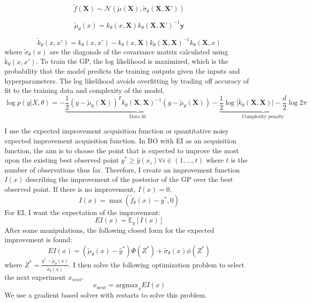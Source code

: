 \begin{equation}
     \tilde f(\mathbf X) \sim \mathcal N(\tilde \mu(\mathbf X), \tilde \sigma_{\theta}(\mathbf X, \mathbf X'))
\end{equation}

\begin{equation}
    \tilde \mu_{\theta}(x) = k_{\theta}(x, \mathbf X)k_{\theta}(\mathbf X, \mathbf X')^{-1} \mathbf y
\end{equation}

\begin{equation}
    \tilde k_{\theta}(x,x') = k_{\theta}( x, x')-k_{\theta}(x, \mathbf X) k_{\theta}(\mathbf X, \mathbf X)^{-1}k_{\theta}(\mathbf X, x)
\end{equation}
where $\tilde \sigma_{\theta}(x)$ are the diagonals of the covariance matrix calculated using $\tilde k_{\theta}(x, x')$.
To train the GP, the log likelihood is maximized, which is the probability that the model predicts the training outputs given the inputs and hyperparameters. The log likelihood avoids overfitting by trading off accuracy of fit to the training data and complexity of the model.
\begin{equation}
    \log p(y \vert X, \theta) = -\underbrace{\frac{1}{2}(y-\tilde \mu_{\theta}(\mathbf X))^T k_{\theta}(\mathbf X, \mathbf X)^{-1}(y- \tilde\mu_{\theta}(\mathbf X)) }_{\text{Data  fit}}- \underbrace{\frac{1}{2} \log{\vert \tilde k_{\theta}(\mathbf X, \mathbf X) \vert} - \frac{d}{2}\log{2 \pi}}_{\text{Complexity penalty}}
\end{equation}

I use the expected improvement acquisition function or quantitative noisy expected improvement acquisition function. In BO with EI as an acquisition function, the aim is to choose the point that is expected to improve the most upon the existing best observed point $y^* \geq \hat y(x_i) \forall i \in (1, \dots, t)$  where  $t$ is the number of observations thus far. Therefore, I create an improvement function $I(x)$ describing the improvement of the posterior of the GP over the best observed point. If there is no improvement, $I(x)=0$.
\begin{equation}
    I(x) = \max(\tilde f_{\theta}(x) -y^*, 0)
\end{equation}
For EI, I want the expectation of the improvement:
\begin{equation}
    EI(x) = \mathbb E_{y}[I(x)]
\end{equation}
After some manipulations, the following closed form for the expected improvement is found:
\begin{equation}
    EI(x) =(\tilde \mu_{\theta}(x)-\hat y^*)\Phi(Z^*) + \tilde \sigma_{\theta}(x) \phi(Z^*)
\end{equation}
where $Z^*= \frac{y^*-\tilde\mu_{\theta}(x)}{\tilde \sigma_{\theta}(x)}$.  I then solve the following optimization problem to select the next experiment $x_{next}$.
\begin{equation}
    x_{\text{next}} = \text{argmax}_{x} EI(x)
\end{equation}
We use a gradient based solver with restarts to solve this problem.

